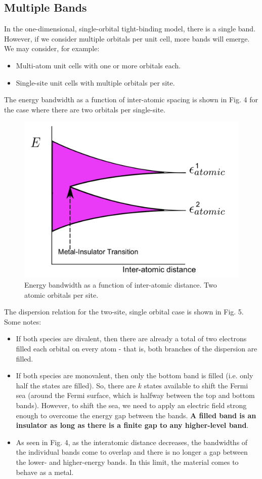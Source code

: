 \documentclass[10pt]{article}
\begin{document}
\subsection{Multiple Bands}
In the one-dimensional, single-orbital tight-binding model, there is a single band. However, if we consider multiple
orbitals per unit cell, more bands will emerge. We may consider, for example:
\begin{itemize}
  \item Multi-atom unit cells with one or more orbitals each.
  \item Single-site unit cells with multiple orbitals per site.
\end{itemize}
The energy bandwidth as a function of inter-atomic spacing is shown in Fig. 4 for the case where there are two orbitals per single-site.
\begin{figure}
  \centering
    \includegraphics[width=\textwidth]{tb4}
    \caption{Energy bandwidth as a function of inter-atomic distance. Two atomic orbitals per site.}
\end{figure}
The dispersion relation for the two-site, single orbital case is shown in Fig. 5. Some notes:
\begin{itemize}
  \item If both species are divalent, then there are already a total of two electrons filled each orbital on every atom - that is,
  both branches of the dispersion are filled.
  \item If both species are monovalent, then only the bottom band is filled (i.e. only half the states are filled). So, there are $k$
  states available to shift the Fermi sea (around the Fermi surface, which is halfway between the top and bottom bands). However, to
  shift the sea, we need to apply an electric field strong enough to overcome the energy gap between the bands. \textbf{A filled band
  is an insulator as long as there is a finite gap to any higher-level band}.
  \item As seen in Fig. 4, as the interatomic distance decreases, the bandwidths of the individual bands come to overlap and there is no
  longer a gap between the lower- and higher-energy bands. In this limit, the material comes to behave as a metal.
\end{itemize}
\end{document}
